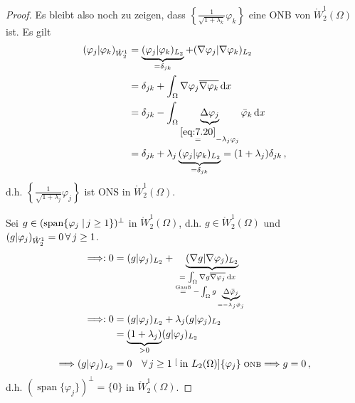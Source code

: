 \begin{proof}
Es bleibt also noch zu zeigen, dass $\left\{\frac 1{\sqrt{1+\lambda_k}} \varphi_k\right\}$ eine ONB von $\mathring W^1_2(\Omega)$ ist. Es gilt
\begin{align*}
(\varphi_j \vert \varphi_k)_{\mathring W^1_2} & = \underbrace{(\varphi_j \vert \varphi_k)_{L_2} }_{= \delta_{jk}}+ (\nabla\varphi_j \vert \nabla\varphi_k)_{L_2}  \\
&= \delta_{jk} + \int_\Omega \nabla \varphi_j \overline{\nabla\varphi_k} \,\mathrm{d} x \\
&= \delta_{jk} - \int_\Omega \underbrace{\Delta\varphi_j}_{\stackrel{\eqref{eq:7.20}}=-\lambda_j \varphi_j} \bar \varphi_k \,\mathrm{d} x \\
&= \delta_{jk} + \lambda_j \underbrace{(\varphi_j \vert \varphi_k)_{L_2}}_{= \delta_{jk}} = (1+\lambda_j) \delta_{jk} \, ,
\end{align*}
d.h. $\left\{\frac1{\sqrt{1+\lambda_j}} \varphi_j\right\}$ ist ONS in $\mathring W^1_2 (\Omega)$.

Sei $g \in (\operatorname{span} \{\varphi_j \;\vert\, j \geq 1\})^\perp$ in $\mathring W^1_2(\Omega)$, d.h. $g \in \mathring W^1_2(\Omega)$ und $(g \vert \varphi_j)_{\mathring W^1_2} = 0 \, \forall \, j \geq 1$.
\begin{align*}
 \Ra : 0& = (g \vert \varphi_j)_{L_2} + \underbrace{(\nabla g \vert \nabla \varphi_j)_{L_2}}_{\parbox{2.6cm}{\scriptsize $\, \, \,  = \int_\Omega \nabla g \overline{\nabla\varphi_j} \d x \\ \stackrel{\text{Gauß}}= - \int_\Omega g \underbrace{\Delta \bar \varphi_j}_{=-\lambda_j \bar \varphi_j}$}} \\
 \Ra : 0 &= (g \vert \varphi_j)_{L_2} + \lambda_j (g\vert \varphi_j)_{L_2} \\
 & = \underbrace{(1+\lambda_j)}_{>0} (g \vert \varphi_j)_{L_2}\\
 \Ra (g \vert \varphi_j)_{L_2}& = 0 \quad \fa \, j \geq 1 \stackrel[\scriptsize\text{in } L_2(\Omega)]{\scriptsize\{\varphi_j\} \text{ ONB}}\Ra g = 0 \, ,
\end{align*}
d.h. $(\operatorname{span} \{\varphi_j\})^\perp = \{0\}$ in $\mathring W^1_2(\Omega)$.
\end{proof}


